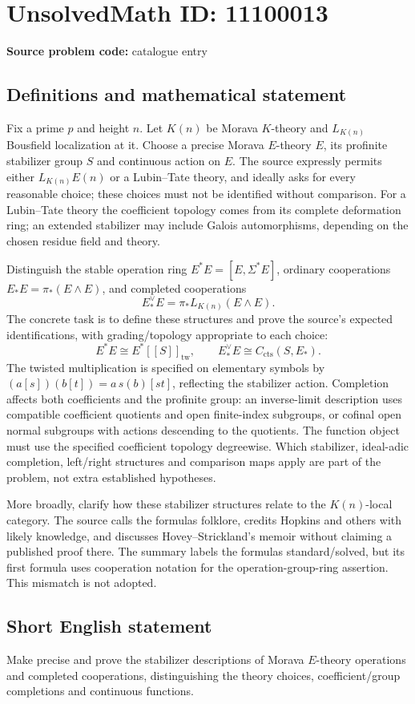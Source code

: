 \documentclass[11pt]{article}
\begin{document}
\section*{UnsolvedMath ID: 11100013}
\textbf{Source problem code:} catalogue entry
\subsection{Definitions and mathematical statement}
Fix a prime \(p\) and height \(n\). Let \(K(n)\) be Morava \(K\)-theory and \(L_{K(n)}\) Bousfield localization at it. Choose a precise Morava \(E\)-theory \(E\), its profinite stabilizer group \(S\) and continuous action on \(E\). The source expressly permits either \(L_{K(n)}E(n)\) or a Lubin--Tate theory, and ideally asks for every reasonable choice; these choices must not be identified without comparison. For a Lubin--Tate theory the coefficient topology comes from its complete deformation ring; an extended stabilizer may include Galois automorphisms, depending on the chosen residue field and theory.

Distinguish the stable operation ring \(E^*E=[E,\Sigma^*E]\), ordinary cooperations \(E_*E=\pi_*(E\wedge E)\), and completed cooperations
\[
 E_*^\vee E=\pi_*L_{K(n)}(E\wedge E).
\]
The concrete task is to define these structures and prove the source's expected identifications, with grading/topology appropriate to each choice:
\[
 E^*E\cong E^*[[S]]_{\mathrm{tw}},\qquad
 E_*^\vee E\cong C_{\mathrm{cts}}(S,E_*).
\]
The twisted multiplication is specified on elementary symbols by
\((a[s])(b[t])=a\,s(b)[st]\), reflecting the stabilizer action. Completion affects both coefficients and the profinite group: an inverse-limit description uses compatible coefficient quotients and open finite-index subgroups, or cofinal open normal subgroups with actions descending to the quotients. The function object must use the specified coefficient topology degreewise. Which stabilizer, ideal-adic completion, left/right structures and comparison maps apply are part of the problem, not extra established hypotheses.

More broadly, clarify how these stabilizer structures relate to the \(K(n)\)-local category. The source calls the formulas folklore, credits Hopkins and others with likely knowledge, and discusses Hovey--Strickland's memoir without claiming a published proof there. The summary labels the formulas standard/solved, but its first formula uses cooperation notation for the operation-group-ring assertion. This mismatch is not adopted.
\subsection{Short English statement}
Make precise and prove the stabilizer descriptions of Morava \(E\)-theory operations and completed cooperations, distinguishing the theory choices, coefficient/group completions and continuous functions.
\end{document}
